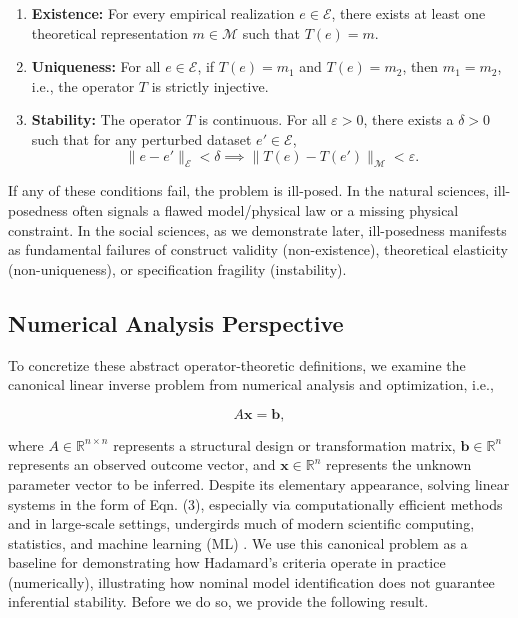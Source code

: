\documentclass{article}
\theoremstyle{definition}
\begin{document}
\begin{enumerate}
    \item \textbf{Existence:} For every empirical realization $e \in \mathcal{E}$, there exists at least one theoretical representation $m \in \mathcal{M}$ such that $T(e) = m$.
    \item \textbf{Uniqueness:} For all $e \in \mathcal{E}$, if $T(e) = m_1$ and $T(e) = m_2$, then $m_1 = m_2$, i.e., the operator $T$ is strictly injective.
    \item \textbf{Stability:} The operator $T$ is continuous. For all $\varepsilon > 0$, there exists a $\delta > 0$ such that for any perturbed dataset $e' \in \mathcal{E}$,
    \begin{equation}
        \|e - e'\|_\mathcal{E} < \delta \implies \|T(e) - T(e')\|_\mathcal{M} < \varepsilon.
    \end{equation}
\end{enumerate}

\noindent
If any of these conditions fail, the problem is ill-posed. In the natural sciences, ill-posedness often signals a flawed model/physical law or a missing physical constraint. In the social sciences, as we demonstrate later, ill-posedness manifests as fundamental failures of construct validity (non-existence), theoretical elasticity (non-uniqueness), or specification fragility (instability).

\subsection{Numerical Analysis Perspective}

To concretize these abstract operator-theoretic definitions, we examine the canonical linear inverse problem from numerical analysis and optimization, i.e.,

\begin{equation}
A\mathbf{x} = \mathbf{b},
\end{equation}

\noindent
where $A \in \mathbb{R}^{n \times n}$ represents a structural design or transformation matrix, $\mathbf{b} \in \mathbb{R}^n$ represents an observed outcome vector, and $\mathbf{x} \in \mathbb{R}^n$ represents the unknown parameter vector to be inferred. Despite its elementary appearance, solving linear systems in the form of Eqn. (3), especially via computationally efficient methods and in large-scale settings, undergirds much of modern scientific computing, statistics, and machine learning (ML) \cite{Sol15}. We use this canonical problem as a baseline for demonstrating how Hadamard's criteria operate in practice (numerically), illustrating how nominal model identification does not guarantee inferential stability. Before we do so, we provide the following result.
\end{document}
